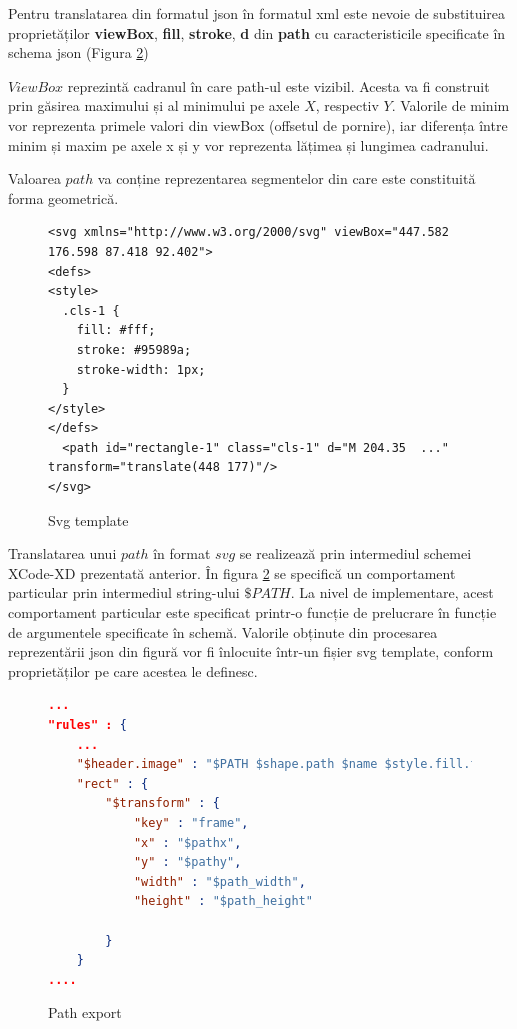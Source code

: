 Pentru translatarea din formatul json în formatul xml este nevoie de substituirea proprietăților \textbf{viewBox}, \textbf{fill}, \textbf{stroke}, \textbf{d} din \textbf{path} cu caracteristicile specificate în schema json (Figura \ref{fig:PathExport})


$ViewBox$ reprezintă cadranul în care path-ul este vizibil. Acesta va fi construit prin găsirea maximului și al minimului pe axele $X$, respectiv $Y$. Valorile de minim vor reprezenta primele valori din viewBox (offsetul de pornire), iar diferența între minim și maxim pe axele x și y vor reprezenta lățimea și lungimea cadranului.

Valoarea $path$ va conține reprezentarea segmentelor din care este constituită forma geometrică.

\begin{figure}[!htbp]
\lstset{language=XML}
\begin{lstlisting}
<svg xmlns="http://www.w3.org/2000/svg" viewBox="447.582 176.598 87.418 92.402">
<defs>
<style>
  .cls-1 {
    fill: #fff;
    stroke: #95989a;
    stroke-width: 1px;
  }
</style>
</defs>
  <path id="rectangle-1" class="cls-1" d="M 204.35  ..." transform="translate(448 177)"/>
</svg>
\end{lstlisting}
\caption{Svg template}\label{fig:svg}
\end{figure}

Translatarea unui $path$ în format $svg$ se realizează prin intermediul schemei XCode-XD prezentată anterior. În figura \ref{fig:PathExport} se specifică un comportament particular prin intermediul string-ului $\$PATH$. La nivel de implementare, acest comportament particular este specificat printr-o funcție de prelucrare în funcție de argumentele specificate în schemă. Valorile obținute din procesarea reprezentării json din figură vor fi înlocuite într-un fișier svg template, conform proprietăților pe care acestea le definesc. 

\begin{figure}[!htbp]
\begin{lstlisting}[language=json,firstnumber=1]
...
"rules" : {
    ...
    "$header.image" : "$PATH $shape.path $name $style.fill.type $style.fill.color.value $transform $style.stroke.color.value $style.stroke.width",
    "rect" : {
        "$transform" : {
            "key" : "frame",
            "x" : "$pathx",
            "y" : "$pathy",
            "width" : "$path_width",
            "height" : "$path_height"
                        
        }
    }
....
\end{lstlisting}
\caption{Path export} \label{fig:PathExport}
\end{figure}


